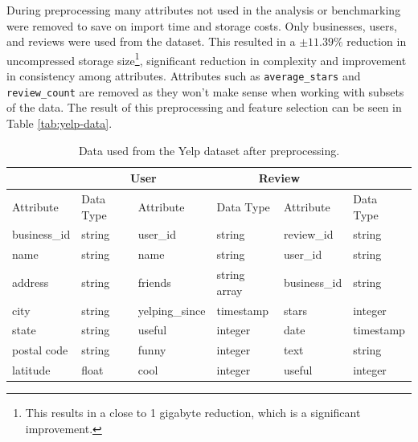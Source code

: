 During preprocessing many attributes not used in the analysis or benchmarking were removed to save on import time and storage costs. Only businesses, users, and reviews were used from the dataset. This resulted in a $\pm11.39\%$ reduction in uncompressed storage size\footnote{This results in a close to 1 gigabyte reduction, which is a significant improvement.}, significant reduction in complexity and improvement in consistency among attributes. Attributes such as \texttt{average\_stars} and \texttt{review\_count} are removed as they won't make sense when working with subsets of the data. The result of this preprocessing and feature selection can be seen in Table \ref{tab:yelp-data}.

\begin{table}[h]
    \centering
    \small
    \caption{Data used from the Yelp dataset after preprocessing.}
    \vspace*{5mm}
    \begin{tabular}{ |p{2cm}|p{2cm}||p{2cm}|p{2cm}||p{2cm}|p{2cm}|}
        \hline
        \rowcolor{Gray}
        \multicolumn{2}{|c||}{Business} & \multicolumn{2}{|c||}{User} & \multicolumn{2}{|c|}{Review}                                           \\
        \hline
        \rowcolor{LightGray}
        Attribute                       & Data Type                   & Attribute       & Data Type    & Attribute    & Data Type \\
        \hline
        business\_id                    & string                      & user\_id        & string       & review\_id   & string    \\
        name                            & string                      & name            & string       & user\_id     & string    \\
        address                         & string                      & friends         & string array & business\_id & string    \\
        city                            & string                      & yelping\_since  & timestamp    & stars        & integer   \\
        state                           & string                      &  useful         & integer      & date         & timestamp \\
        postal code                     & string                      &  funny          & integer      & text         & string    \\
        latitude                        & float                       &  cool           & integer      & useful       & integer   \\

\end{tabular}
\end{table}
